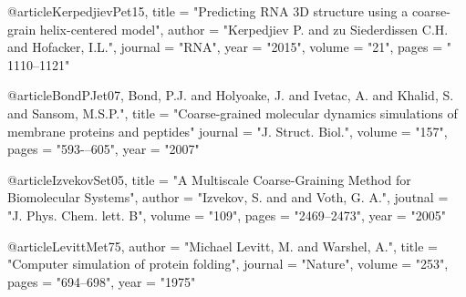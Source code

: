@article{KerpedjievPet15,
title = "Predicting RNA 3D structure using a coarse-grain helix-centered model",
author = "Kerpedjiev P. and zu Siederdissen C.H. and Hofacker, I.L.",
journal = "RNA", year = "2015", volume = "21", pages = " 1110--1121" 
}

@article{BondPJet07,
Bond, P.J. and Holyoake, J. and Ivetac, A. and Khalid, S. and Sansom, M.S.P.",
title = "Coarse-grained molecular dynamics simulations of membrane proteins and peptides"
journal = "J. Struct. Biol.",
volume = "157", pages = "593-–605", year = "2007"
}

@article{IzvekovSet05,
title = "A Multiscale Coarse-Graining Method for Biomolecular Systems",
author = "Izvekov, S. and and Voth, G. A.",
joutnal = "J. Phys. Chem. lett. B", volume = "109", pages = "2469--2473", year = "2005"
}

@article{LevittMet75,
author = "Michael Levitt, M. and Warshel, A.",
title = "Computer simulation of protein folding",
journal = "Nature", volume = "253", pages = "694--698", year = "1975"
}

